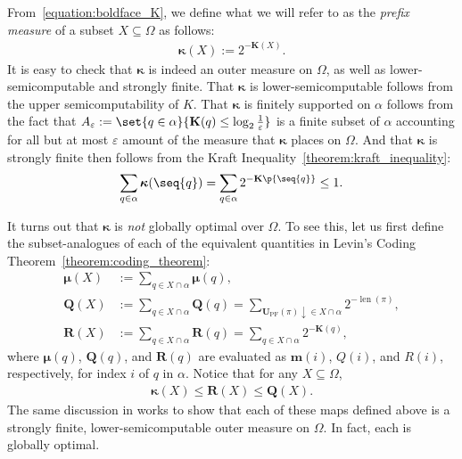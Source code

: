 From~\eqref{equation:boldface_K}, we define what we will refer to as the \textit{prefix measure} of a subset $X \subseteq \Omega$ as follows:
\begin{align*}
    \boldsymbol{\kappa}(X) := 2^{-\mathbf{K}(X)}.
\end{align*}
It is easy to check that $\boldsymbol{\kappa}$ is indeed an outer measure on $\Omega$, as well as lower-semicomputable and strongly finite. That $\boldsymbol{\kappa}$ is lower-semicomputable follows from the upper semicomputability of $K$. That $\boldsymbol{\kappa}$ is finitely supported on $\alpha$ follows from the fact that $A_\varepsilon := \set{q \in \alpha}{\mathbf{K}(q) \leq \log_2 \frac{1}{\varepsilon}}$ is a finite subset of $\alpha$ accounting for all but at most $\varepsilon$ amount of the measure that $\boldsymbol{\kappa}$ places on $\Omega$. And that $\boldsymbol{\kappa}$ is strongly finite then follows from the Kraft Inequality~\ref{theorem:kraft_inequality}:
\begin{align*}
    \sum_{q \in \alpha} \boldsymbol{\kappa}(\seq{q}) = \sum_{q \in \alpha} 2^{-\mathbf{K}\p{\seq{q}}} \leq 1.
\end{align*}

It turns out that $\boldsymbol{\kappa}$ is \textit{not} globally optimal over $\Omega$. To see this, let us first define the subset-analogues of each of the equivalent quantities in Levin's Coding Theorem~\ref{theorem:coding_theorem}:
\begin{align*}
    \mathbf{\boldsymbol{\mu}}(X) &:= \sum_{q \in X \cap \alpha} \mathbf{\boldsymbol{\mu}}(q),\\
    \mathbf{Q}(X) &:= \sum_{q \in X \cap \alpha} \mathbf{Q}(q) = \sum_{\mathbf{U}_{\operatorname{PF}}(\pi) \downarrow \in X \cap \alpha} 2^{-\operatorname{len}(\pi)},\\
    \mathbf{R}(X) &:= \sum_{q \in X \cap \alpha} \mathbf{R}(q) = \sum_{q \in X \cap \alpha} 2^{-\mathbf{K}(q)},
\end{align*}
where $\mathbf{\boldsymbol{\mu}}(q)$, $\mathbf{Q}(q)$, and $\mathbf{R}(q)$ are evaluated as $\mathbf{m}(i)$, $Q(i)$, and $R(i)$, respectively, for index $i$ of $q$ in $\alpha$. Notice that for any $X \subseteq \Omega$, 
\begin{align*}
    \boldsymbol{\kappa}(X) \leq \mathbf{R}(X) \leq \mathbf{Q}(X).
\end{align*}
The same discussion in \cite{LL20} works to show that each of these maps defined above is a strongly finite, lower-semicomputable outer measure on $\Omega$. In fact, each is globally optimal. 

